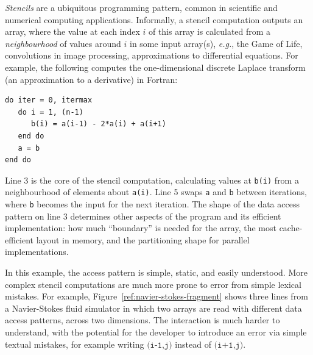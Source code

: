 \documentclass[9pt,preprint]{sigplanconf}
\theoremstyle{definition}
\newcommand{\eg}{\emph{e.g.}}
\begin{document}
\emph{Stencils} are a ubiquitous programming pattern, common in
scientific and numerical computing applications. Informally, a stencil
computation outputs an array, where the value at each index $i$ of
this array is calculated from a \emph{neighbourhood} of values around $i$ in
some input array(s), \eg{}, the Game of Life, convolutions in image
processing, approximations to differential equations. For example, the
following computes the one-dimensional discrete Laplace
transform (an approximation to a derivative) in Fortran:
%
\begin{verbatim}
do iter = 0, itermax
   do i = 1, (n-1)
      b(i) = a(i-1) - 2*a(i) + a(i+1)
   end do
   a = b
end do
\end{verbatim}
%
Line 3 is the core of the stencil computation, calculating
values at \texttt{b(i)} from a neighbourhood of elements about
\texttt{a(i)}. Line 5 swaps
\texttt{a} and \texttt{b} between iterations, where \texttt{b} becomes the
input for the next iteration. %
%
The shape of the data access pattern on line 3 determines other aspects of the
program and its efficient implementation: how much ``boundary'' is
needed for the array, the most cache-efficient layout in memory,
and the partitioning shape for parallel implementations.

In this example, the access pattern is simple, static, and easily
understood. More complex stencil computations
are much more prone to error from simple lexical mistakes. For example,
Figure~\ref{ref:navier-stokes-fragment} shows three lines from a
Navier-Stokes fluid simulator in which two arrays are read with
different data access patterns, across two dimensions. The interaction
is much harder to understand, with the potential for the developer to
introduce an error via simple textual mistakes, for
example writing $\texttt{(i-1,j)}$ instead of $\texttt{(i+1,j)}$.
\end{document}
